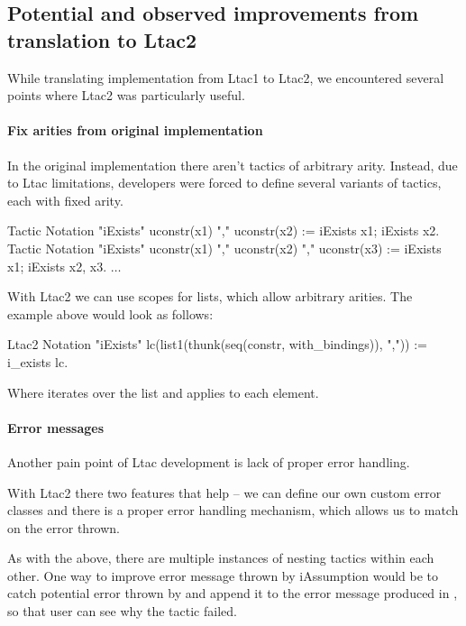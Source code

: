 \subsection{Potential and observed improvements from translation to Ltac2}
\label{sec:impr-from-transl}

While translating implementation from Ltac1 to Ltac2, we encountered several points where Ltac2 was particularly useful.

\paragraph{Fix arities from original implementation}

In the original implementation there aren't tactics of arbitrary arity.
Instead, due to Ltac limitations, developers were forced to define several variants of tactics, each with fixed arity.

\begin{coq}
Tactic Notation "iExists" uconstr(x1) "," uconstr(x2) :=
  iExists x1; iExists x2.
Tactic Notation "iExists" uconstr(x1) "," uconstr(x2) "," uconstr(x3) :=
  iExists x1; iExists x2, x3.
$\ldots$
\end{coq}

With Ltac2 we can use scopes for lists, which allow arbitrary arities.
The example above would look as follows:

\begin{coq}
  Ltac2 Notation "iExists" lc(list1(thunk(seq(constr, with_bindings)), ",")) :=
  i_exists$\text{~}$lc.
\end{coq}

Where  iterates over the list and applies  to each element.

\paragraph{Error messages}

Another pain point of Ltac development is lack of proper error handling.

With Ltac2 there two features that help -- we can define our own custom error classes and there is a proper error handling mechanism, which allows us to match on the error thrown.

As with the  above, there are multiple instances of nesting tactics within each other.
One way to improve error message thrown by iAssumption would be to catch potential error thrown by  and append it to the error message produced in , so that user can see why the tactic failed.

